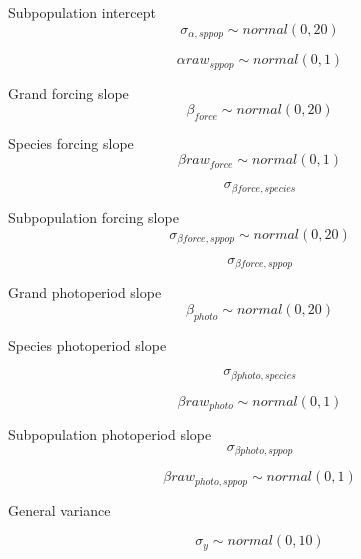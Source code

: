 \documentclass[11pt,letter]{article}
\begin{document}
Subpopulation intercept 
\begin{equation}
\sigma_{\alpha, sppop} \sim normal(0,20)
\end{equation}

\begin{equation}
\alpha raw _{sppop}\sim normal(0,1)
\end{equation}


Grand forcing slope
\begin{equation}
\beta_{force}  \sim normal(0,20)
\end{equation}

Species forcing slope 
\begin{equation}
\beta raw_{force}\sim normal(0,1)
\end{equation}

\begin{equation}
\sigma_{\beta force,species}
\end{equation}

Subpopulation forcing slope 
\begin{equation}
 \sigma_{\beta force,sppop} \sim normal(0,20)
\end{equation}

\begin{equation}
\sigma_{\beta force,sppop}
\end{equation}

Grand photoperiod slope 
\begin{equation}
\beta_{photo}  \sim normal(0,20)
\end{equation}

Species photoperiod slope 

\begin{equation}
\sigma_{\beta photo,species}
\end{equation}

\begin{equation}
\beta raw_{photo}\sim normal(0,1)
\end{equation}

Subpopulation photoperiod slope 
\begin{equation}
\sigma_{\beta photo,sppop}
\end{equation}

\begin{equation}
\beta raw_{photo, sppop}\sim normal(0,1)
\end{equation}

General variance 

\begin{equation}
\sigma{_y}\sim normal(0,10)
\end{equation}
\end{document}
